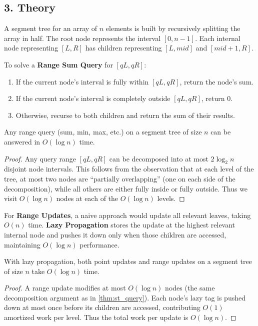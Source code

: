 \subsection{3. Theory}
A segment tree for an array of $n$ elements is built by recursively splitting the array in half. The root node represents the interval $[0, n-1]$. Each internal node representing $[L, R]$ has children representing $[L, mid]$ and $[mid+1, R]$.

To solve a \textbf{Range Sum Query} for $[qL, qR]$:
\begin{enumerate}
    \item If the current node's interval is fully within $[qL, qR]$, return the node's sum.
    \item If the current node's interval is completely outside $[qL, qR]$, return 0.
    \item Otherwise, recurse to both children and return the sum of their results.
\end{enumerate}

\begin{theorem}
\label{thm:st_query}
Any range query (sum, min, max, etc.) on a segment tree of size $n$ can be answered in $O(\log n)$ time.
\end{theorem}
\begin{proof}
Any query range $[qL, qR]$ can be decomposed into at most $2\log_2 n$ disjoint node intervals. This follows from the observation that at each level of the tree, at most two nodes are ``partially overlapping'' (one on each side of the decomposition), while all others are either fully inside or fully outside. Thus we visit $O(\log n)$ nodes at each of the $O(\log n)$ levels.
\end{proof}

For \textbf{Range Updates}, a naive approach would update all relevant leaves, taking $O(n)$ time. \textbf{Lazy Propagation} stores the update at the highest relevant internal node and pushes it down only when those children are accessed, maintaining $O(\log n)$ performance.

\begin{theorem}
\label{thm:st_lazy}
With lazy propagation, both point updates and range updates on a segment tree of size $n$ take $O(\log n)$ time.
\end{theorem}
\begin{proof}
A range update modifies at most $O(\log n)$ nodes (the same decomposition argument as in \cref{thm:st_query}). Each node's lazy tag is pushed down at most once before its children are accessed, contributing $O(1)$ amortized work per level. Thus the total work per update is $O(\log n)$.
\end{proof}

